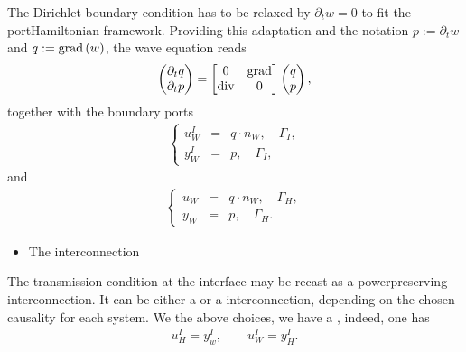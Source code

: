 \documentclass[letterpaper,10pt,english]{sphinxmanual}
\begin{document}
\sphinxAtStartPar
The Dirichlet boundary condition has to be relaxed by
\(\partial_t w = 0\) to fit the port\sphinxhyphen{}Hamiltonian framework.
Providing this adaptation and the notation \(p := \partial_t w\) and
\(q := {\rm grad}\left(w\right)\), the wave equation reads
\begin{equation*}
\begin{split}\begin{pmatrix} \partial_t q \\ \partial_t p \end{pmatrix} =
\begin{bmatrix} 0 & {\rm grad} \\ {\rm div} & 0 \end{bmatrix}
\begin{pmatrix} q \\ p \end{pmatrix},\end{split}
\end{equation*}
\sphinxAtStartPar
together with the boundary ports
\begin{equation*}
\begin{split}\left\lbrace
\begin{array}{rcl}
u^I_W &=& q \cdot n_W, \quad \Gamma_I, \\
y^I_W &=& p, \quad \Gamma_I,
\end{array}
\right.\end{split}
\end{equation*}
\sphinxAtStartPar
and
\begin{equation*}
\begin{split}\left\lbrace
\begin{array}{rcl}
u_W &=& q \cdot n_W, \quad \Gamma_H, \\
y_W &=& p, \quad \Gamma_H.
\end{array}
\right.\end{split}
\end{equation*}\begin{itemize}
\item {} 
\sphinxAtStartPar
The interconnection

\end{itemize}

\sphinxAtStartPar
The transmission condition at the interface may be recast as a
power\sphinxhyphen{}preserving interconnection. It can be either a  or a
 interconnection, depending on the chosen causality for
each system. We the above choices, we have a , indeed, one has
\begin{equation*}
\begin{split}u^I_H = y^I_w, \qquad u^I_W = y^I_H.\end{split}
\end{equation*}
\end{document}

